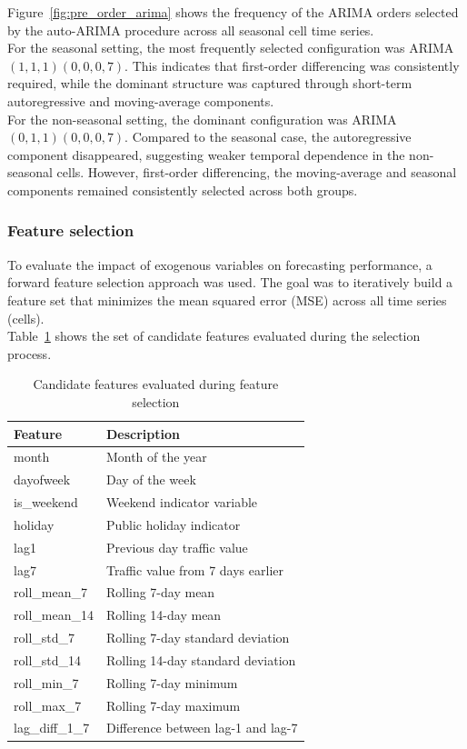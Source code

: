 Figure~\ref{fig:pre_order_arima} shows the frequency of the ARIMA orders selected by the auto-ARIMA procedure across all seasonal cell time series. \\

For the seasonal setting, the most frequently selected configuration was ARIMA$(1,1,1)(0,0,0,7)$. This indicates that first-order differencing was consistently required, while the dominant structure was captured through short-term autoregressive and moving-average components. \\

For the non-seasonal setting, the dominant configuration was ARIMA$(0,1,1)(0,0,0, 7)$. Compared to the seasonal case, the autoregressive component disappeared, suggesting weaker temporal dependence in the non-seasonal cells. However, first-order differencing, the moving-average and seasonal components remained consistently selected across both groups. \\

\subsubsection{Feature selection}
To evaluate the impact of exogenous variables on forecasting performance, a forward feature selection approach was used. The goal was to iteratively build a feature set that minimizes the mean squared error (MSE) across all time series (cells). \\

Table~\ref{tab:tested_features} shows the set of candidate features evaluated during the selection process.

\begin{table}[htbp]
\centering
\caption{Candidate features evaluated during feature selection}
\label{tab:tested_features}

\begin{tabular}{ll}
\toprule
\textbf{Feature} & \textbf{Description} \\
\midrule
month & Month of the year \\
dayofweek & Day of the week \\
is\_weekend & Weekend indicator variable \\
holiday & Public holiday indicator \\
lag1 & Previous day traffic value \\
lag7 & Traffic value from 7 days earlier \\
roll\_mean\_7 & Rolling 7-day mean \\
roll\_mean\_14 & Rolling 14-day mean \\
roll\_std\_7 & Rolling 7-day standard deviation \\
roll\_std\_14 & Rolling 14-day standard deviation \\
roll\_min\_7 & Rolling 7-day minimum \\
roll\_max\_7 & Rolling 7-day maximum \\
lag\_diff\_1\_7 & Difference between lag-1 and lag-7 \\
\bottomrule
\end{tabular}
\end{table}

